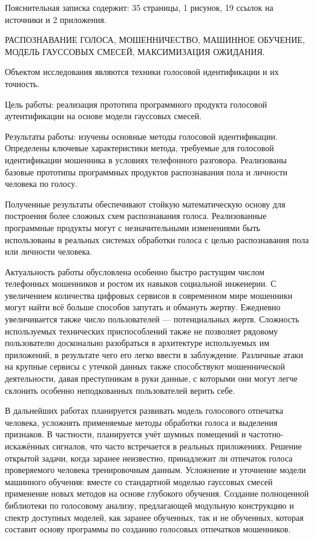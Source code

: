 \documentclass{gost-7-32}
\begin{document}
\sloppy

\essay

Пояснительная записка содержит: 35 страницы, 1 рисунок, 19 ссылок на источники и 2 приложения.

РАСПОЗНАВАНИЕ ГОЛОСА, МОШЕННИЧЕСТВО, МАШИННОЕ  ОБУЧЕНИЕ, МОДЕЛЬ ГАУССОВЫХ СМЕСЕЙ, МАКСИМИЗАЦИЯ ОЖИДАНИЯ.

Объектом исследования являются техники голосовой идентификации и их точность.

Цель работы: реализация прототипа программного продукта голосовой аутентификации на основе модели гауссовых смесей.

Результаты работы: изучены основные методы голосовой идентификации.
Определены ключевые характеристики метода, требуемые для голосовой идентификации мошенника в условиях телефонного разговора.
Реализованы базовые прототипы программных продуктов распознавания пола и личности человека по голосу.

Полученные результаты обеспечивают стойкую математическую основу для построения более сложных схем распознавания голоса.
Реализованные программные продукты могут с незначительными изменениями быть использованы в реальных системах обработки голоса с целью распознавания пола или личности человека.

Актуальность работы обусловлена особенно быстро растущим числом телефонных мошенников и ростом их навыков социальной инженерии.
С увеличением количества цифровых сервисов в современном мире мошенники могут найти всё больше способов запутать и обмануть жертву.
Ежедневно увеличивается также число пользователей --- потенциальных жертв.
Сложность используемых технических приспособлений также не позволяет рядовому пользователю досконально разобраться в архитектуре используемых им приложений, в результате чего его легко ввести в заблуждение.
Различные атаки на крупные сервисы с утечкой данных также способствуют мошеннической деятельности, давая преступникам в руки данные, с которыми они могут легче склонить особенно неподкованных пользователей верить себе.

В дальнейших работах планируется развивать модель голосового отпечатка человека, усложнять применяемые методы обработки голоса и выделения признаков.
В частности, планируется учёт шумных помещений и частотно-искажённых сигналов, что часто встречается в реальных приложениях.
Решение открытой задачи, когда заранее неизвестно, принадлежит ли отпечаток голоса проверяемого человека тренировочным данным.
Усложнение и уточнение модели машинного обучения: вместе со стандартной моделью гауссовых смесей применение новых методов на основе глубокого обучения.
Создание полноценной библиотеки по голосовому анализу, предлагающей модульную конструкцию и спектр доступных моделей, как заранее обученных, так и не обученных, которая составит основу программы по созданию голосовых отпечатков мошенников.
\end{document}
